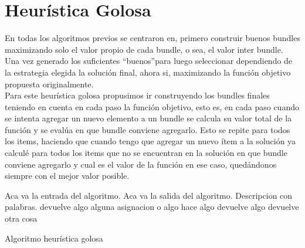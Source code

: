 \section{Heurística Golosa}
En todas los algoritmos previos se centraron en, primero construir buenos bundles maximizando solo 
el valor propio de cada bundle, o sea, el valor inter bundle. Una vez generado los suficientes 
\textquotedblleft buenos\textquotedblright  para luego seleccionar dependiendo de la 
estrategia elegida la solución final, ahora si, maximizando la función objetivo propuesta 
originalmente.\\
Para este heurística golosa propusimos ir construyendo los bundles finales teniendo en cuenta en 
cada paso la función objetivo, esto es, en cada paso cuando se intenta agregar un nuevo elemento a 
un bundle se calcula su valor total de la función y se evalúa en que bundle conviene agregarlo. 
Esto se repite para todos los items, haciendo que cuando tengo que agregar un nuevo ítem a la 
solución ya calculé para todos los items que no se encuentran en la solución en que bundle conviene 
agregarlo y cual es el valor de la función en ese caso, quedándonos siempre con el mejor valor 
posible.
\begin{algorithm}[H]
\begin{algorithmic}[1]
\REQUIRE Aca va la entrada del algoritmo.
\ENSURE Aca va la salida del algoritmo.
\STATE Descripcion con palabras.
\RETURN devuelve algo
\ELSE
\STATE alguna asignacion o algo
\ENDIF
\ENDWHILE
{}
\STATE hace algo
\RETURN devuelve algo
\ENDIF
\ENDFOR
\RETURN devuelve otra cosa
\end{algorithmic}
\caption{Algoritmo heurística golosa}\label{alg:algHeuGol}
\end{algorithm}
